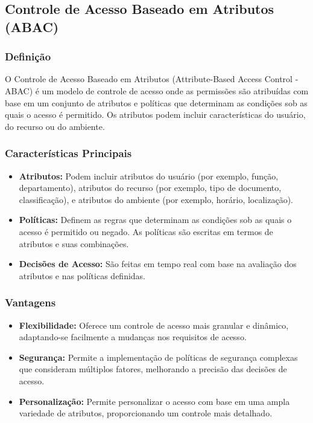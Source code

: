 \documentclass{scrartcl}
\begin{document}
\subsection{Controle de Acesso Baseado em Atributos (ABAC)}
\label{sec:orgd5f10a4}
\subsubsection{Definição}
\label{sec:org584c86c}
O Controle de Acesso Baseado em Atributos (Attribute-Based Access Control -
ABAC) é um modelo de controle de acesso onde as permissões são atribuídas com
base em um conjunto de atributos e políticas que determinam as condições sob as
quais o acesso é permitido. Os atributos podem incluir características do
usuário, do recurso ou do ambiente.

\subsubsection{Características Principais}
\label{sec:orge4a425c}
\begin{itemize}
\item \textbf{\textbf{Atributos:}} Podem incluir atributos do usuário (por exemplo, função,
departamento), atributos do recurso (por exemplo, tipo de documento,
classificação), e atributos do ambiente (por exemplo, horário, localização).
\item \textbf{\textbf{Políticas:}} Definem as regras que determinam as condições sob as quais o
acesso é permitido ou negado. As políticas são escritas em termos de atributos
e suas combinações.
\item \textbf{\textbf{Decisões de Acesso:}} São feitas em tempo real com base na avaliação dos
atributos e nas políticas definidas.
\end{itemize}

\subsubsection{Vantagens}
\label{sec:orgcb5c282}
\begin{itemize}
\item \textbf{\textbf{Flexibilidade:}} Oferece um controle de acesso mais granular e dinâmico,
adaptando-se facilmente a mudanças nos requisitos de acesso.
\item \textbf{\textbf{Segurança:}} Permite a implementação de políticas de segurança complexas que
consideram múltiplos fatores, melhorando a precisão das decisões de acesso.
\item \textbf{\textbf{Personalização:}} Permite personalizar o acesso com base em uma ampla
variedade de atributos, proporcionando um controle mais detalhado.
\end{itemize}
\end{document}

